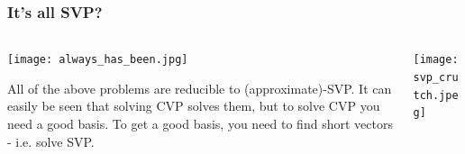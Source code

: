 \documentclass[
aspectratio=169, %
t, %
onlytextwidth, %
10pt, %
]{beamer}
\begin{document}
\begin{frame}
    \frametitle{It's all SVP?}

    \begin{columns}[T] %
        \begin{column}{0.58\linewidth} %
            \texttt{[image: always\_has\_been.jpg]} %

            \vspace{-1.5em}{\tiny\textcolor{ICLBlue}{(Above) Regev discovering the the LWE to $\gamma$-SVP reduction, 2005}}\newline

            \vspace{-2em}All of the above problems are reducible to (approximate)-SVP. It can easily be seen that solving CVP solves them, but to solve CVP you need a good basis.
            To get a good basis, you need to find short vectors - i.e. solve SVP.
        \end{column}
        \begin{column}{0.38\linewidth} %
            \texttt{[image: svp\_crutch.jpeg]} %

            \vspace{-1.5em}{\tiny\textcolor{ICLBlue}{(Above) xkcd Dependency, lattice based cryptography special edition}}
        \end{column}
    \end{columns}
\end{frame}

\end{document}
